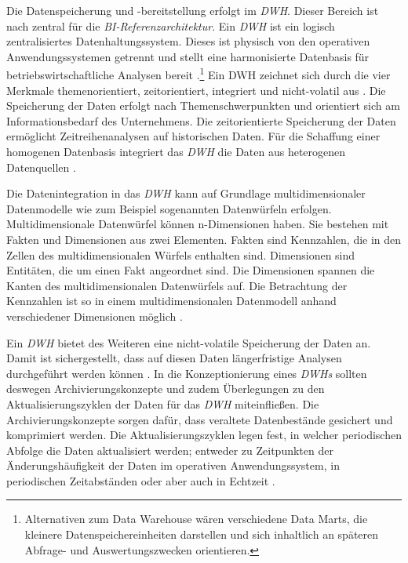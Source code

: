 Die Datenspeicherung und -bereitstellung erfolgt im \textit{\acrshort{DWH}}. Dieser Bereich ist nach \citeauthor{linden_geschaftsmodellbasierte_2016} zentral für die 
\textit{\acrshort{BI}-Referenzarchitektur}\cite[vgl.][135]{linden_geschaftsmodellbasierte_2016}. Ein \textit{\acrlong{DWH}} ist ein logisch zentralisiertes Datenhaltungssystem. Dieses ist physisch 
von den operativen Anwendungssystemen getrennt und stellt eine harmonisierte Datenbasis für betriebswirtschaftliche Analysen bereit \cite[vgl.][135]{mucksch_data_2000}.\footnote{ Alternativen zum Data Warehouse wären verschiedene Data Marts, 
die kleinere Datenspeichereinheiten darstellen und sich inhaltlich an späteren Abfrage- und Auswertungszwecken orientieren.} 
Ein \acrlong{DWH} zeichnet sich durch die vier Merkmale themenorientiert, zeitorientiert, integriert und nicht-volatil aus \cites[vgl.][S. 29 f.;]{inmon_building_nodate_2005}[vgl.][S. 136 f.;]{linden_geschaftsmodellbasierte_2016}[vgl.][S. 271 f.]{abts_grundkurs_2017}. Die Speicherung der Daten erfolgt nach Themenschwerpunkten und
orientiert sich am Informationsbedarf des Unternehmens. Die zeitorientierte Speicherung der Daten ermöglicht Zeitreihenanalysen auf historischen Daten. 
Für die Schaffung einer homogenen Datenbasis integriert das \textit{\acrshort{DWH}} die Daten aus heterogenen Datenquellen \cite[vgl.][136]{linden_geschaftsmodellbasierte_2016}.

Die Datenintegration in das \textit{\acrlong{DWH}} kann auf Grundlage  multidimensionaler Datenmodelle wie zum Beispiel sogenannten Datenwürfeln erfolgen. 
Multidimensionale Datenwürfel können n-Dimensionen haben. Sie bestehen mit Fakten und Dimensionen aus zwei Elementen. 
Fakten sind Kennzahlen, die in den Zellen des multidimensionalen Würfels enthalten sind.
Dimensionen sind Entitäten, die um einen Fakt angeordnet sind. Die Dimensionen spannen die Kanten des multidimensionalen Datenwürfels auf.
Die Betrachtung der Kennzahlen ist so in einem multidimensionalen Datenmodell anhand verschiedener Dimensionen möglich 
\cites[vgl.][S. 13 ff., S. 21 f.;]{farkisch_data-warehouse-systeme_2011}[vgl.][S. 66 f.]{kemper_business_2010}.

Ein \textit{\acrlong{DWH}} bietet des Weiteren eine nicht-volatile Speicherung der Daten an. Damit ist sichergestellt, dass auf diesen Daten längerfristige Analysen durchgeführt werden können \cite[vgl.][136]{linden_geschaftsmodellbasierte_2016}.
In die Konzeptionierung eines \textit{\acrlong{DWH}s} sollten deswegen Archivierungskonzepte und zudem Überlegungen zu den Aktualisierungszyklen der Daten für das \textit{\acrshort{DWH}}
miteinfließen. Die Archivierungskonzepte sorgen dafür, dass veraltete Datenbestände gesichert und komprimiert werden.
Die Aktualisierungszyklen legen fest, in welcher periodischen Abfolge die Daten aktualisiert werden; entweder zu Zeitpunkten der Änderungshäufigkeit
der Daten im operativen Anwendungssystem, in periodischen Zeitabständen oder aber auch in Echtzeit \cite[vgl.][137]{linden_geschaftsmodellbasierte_2016}.


